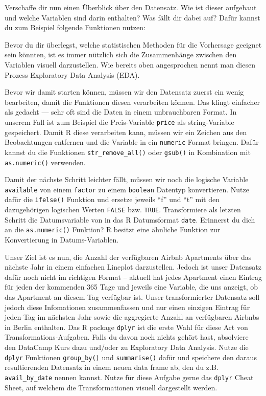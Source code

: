 \documentclass[
]{book}
\begin{document}
Verschaffe dir nun einen Überblick über den Datensatz.
Wie ist dieser aufgebaut und welche Variablen sind darin enthalten?
Was fällt dir dabei auf?
Dafür kannst du zum Beispiel folgende Funktionen nutzen:

Bevor du dir überlegst, welche statistischen Methoden für die Vorhersage geeignet sein könnten, ist es immer nützlich sich die Zusammenhänge zwischen den Variablen visuell darzustellen.
Wie bereits oben angesprochen nennt man diesen Prozess Exploratory Data Analysis (EDA).

Bevor wir damit starten können, müssen wir den Datensatz zuerst ein wenig bearbeiten, damit die Funktionen diesen verarbeiten können.
Das klingt einfacher als gedacht --- sehr oft sind die Daten in einem unbrauchbaren Format.
In unserem Fall ist zum Beispiel die Preis-Variable \texttt{price} als string-Variable gespeichert.
Damit R diese verarbeiten kann, müssen wir ein Zeichen aus den Beobachtungen entfernen und die Variable in ein \texttt{numeric} Format bringen.
Dafür kannst du die Funktionen \texttt{str\_remove\_all()} oder \texttt{gsub()} in Kombination mit \texttt{as.numeric()} verwenden.

Damit der nächste Schritt leichter fällt, müssen wir noch die logische Variable \texttt{available} von einem \texttt{factor} zu einem \texttt{boolean} Datentyp konvertieren.
Nutze dafür die \texttt{ifelse()} Funktion und ersetze jeweils ``f'' und ``t'' mit den dazugehörigen logischen Werten \texttt{FALSE} bzw. \texttt{TRUE}.
Transformiere als letzten Schritt die Datumsvariable von in das R Datumsformat \texttt{date}.
Erinnerst du dich an die \texttt{as.numeric()} Funktion?
R besitzt eine ähnliche Funktion zur Konvertierung in Datums-Variablen.

Unser Ziel ist es nun, die Anzahl der verfügbaren Airbnb Apartments über das nächste Jahr in einem einfachen Lineplot darzustellen.
Jedoch ist unser Datensatz dafür noch nicht im richtigen Format -- aktuell hat jedes Apartment einen Eintrag für jeden der kommenden 365 Tage und jeweils eine Variable, die uns anzeigt, ob das Apartment an diesem Tag verfügbar ist.
Unser transformierter Datensatz soll jedoch diese Infomationen zusammenfassen und nur einen einzigen Eintrag für jeden Tag im nächsten Jahr sowie die aggregierte Anzahl an verfügbaren Airbnbs in Berlin enthalten.
Das R package \texttt{dplyr} ist die erste Wahl für diese Art von Transformations-Aufgaben.
Falls du davon noch nichts gehört hast, absolviere den DataCamp Kurs dazu und/oder zu Exploratory Data Analysis.
Nutze die \texttt{dplyr} Funktionen \texttt{group\_by()} und \texttt{summarise()} dafür und speichere den daraus resultierenden Datensatz in einem neuen data frame ab, den du z.B. \texttt{avail\_by\_date} nennen kannst.
Nutze für diese Aufgabe gerne das \texttt{dplyr} Cheat Sheet, auf welchem die Transformationen visuell dargestellt werden.
\end{document}
